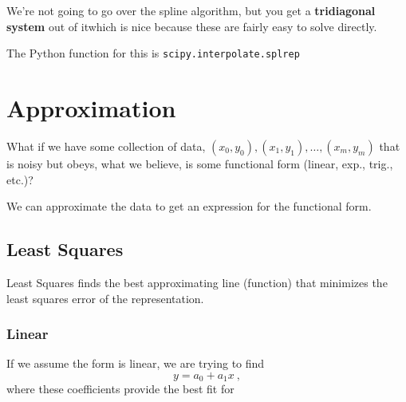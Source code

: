 \documentclass[12pt, answers]{exam}
\begin{document}
We're not going to go over the spline algorithm, but you get a \textbf{tridiagonal system} out of it\textemdash which is nice because these are fairly easy to solve directly. %

The Python function for this is \texttt{scipy.interpolate.splrep}


\section*{Approximation}

What if we have some collection of data, $(x_0, y_0), (x_1, y_1),\dots, (x_m, y_m)$ that is noisy but obeys, what we believe, is some functional form (linear, exp., trig., etc.)?

We can approximate the data to get an expression for the functional form.

\subsection*{Least Squares}
\ifprintanswers
Least Squares finds the best approximating line (function) that minimizes the least squares error of the representation.
\else
\vspace*{3em}
\fi

\subsubsection*{Linear}
If we assume the form is linear, we are trying to find
\[y = a_0 + a_1 x \:,\]
where these coefficients provide the best fit for
 
\end{document}
